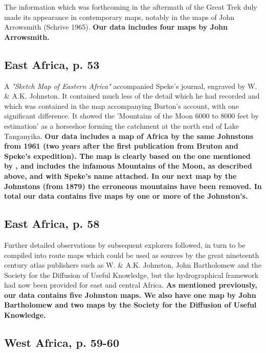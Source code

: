 \documentclass[12pt]{article}
\begin{document}
The information which was forthcoming in the aftermath of the Great Trek duly
made its appearance in contemporary maps, notably in the maps of John Arrowsmith
(Schrive 1965). \textbf{Our data includes four maps by John Arrowsmith.}

\subsection{East Africa, p. 53}

A \textit{"Sketch Map of Eastern Africa"} accompanied Speke's journal, engraved
by W. \& A.K. Johnston. It contained much less of the detail which he had
recorded and which was contained in the map accompanying Burton's account, with
one significant difference. It showed the 'Mountains of the Moon 6000 to 8000
feet by estimation' as a horseshoe forming the catchment at the north end of
Lake Tanganyika.  \textbf{Our data includes a map of Africa by the same
	Johnstons from 1961 (two years after the first publication from Bruton
	and Speke's expedition). The map is clearly based on the one mentioned
	by \citet{Stone1995}, and includes the infamous Mountains of the Moon,
	as described above, and with Speke's name attached. In our next map by
the Johnstons (from 1879) the erroneous mountains have been removed. In total
our data contains five maps by one or more of the Johnston's.}

\subsection{East Africa, p. 58}

Further detailed observations by subsequent explorers followed, in turn to be
compiled into route maps which could be used as sources by the great nineteenth
century atlas publishers such as W. \& A.K. Johnston, John Bartholomew and the
Society for the Diffusion of Useful Knowledge, but the hydrographical framework
had now been provided for east and central Africa. \textbf{As mentioned
previously, our data contains five Johnston maps. We also have one map by John
Bartholomew and two maps by the Society for the Diffusion of Useful Knowledge.}

\subsection{West Africa, p. 59-60}
\end{document}
